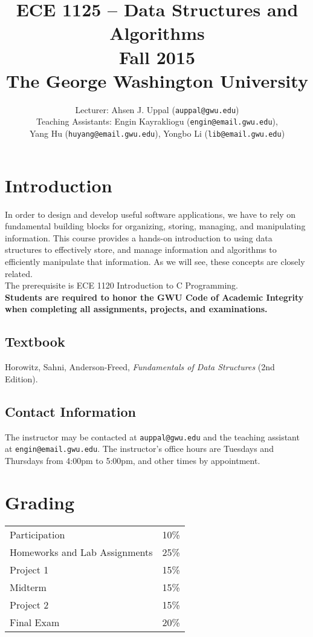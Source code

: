 \documentclass{article}
\title{ECE 1125 -- Data Structures and Algorithms \\ Fall 2015 \\ The George Washington University}
\author{Lecturer: Ahsen J. Uppal (\texttt{auppal@gwu.edu})
\\ Teaching Assistants: Engin Kayrakliogu (\texttt{engin@email.gwu.edu}), \\
Yang Hu (\texttt{huyang@email.gwu.edu}), Yongbo Li (\texttt{lib@email.gwu.edu})}
\date{}
\begin{document}
\maketitle

\section{Introduction}
In order to design and develop useful software applications, we have
to rely on fundamental building blocks for organizing, storing,
managing, and manipulating information. This course provides a
hands-on introduction to using data structures to effectively store,
and manage information and algorithms to efficiently manipulate that
information. As we will see, these concepts are closely related.
\\

The prerequisite is ECE 1120 Introduction to C Programming.
\\

\noindent
\textbf{Students are required to honor the GWU Code of Academic Integrity when completing all assignments, projects, and examinations.}

\subsection{Textbook}
Horowitz, Sahni, Anderson-Freed, \textit{Fundamentals of Data Structures} (2nd Edition).

\subsection{Contact Information}
The instructor may be contacted at \texttt{auppal@gwu.edu} and the
teaching assistant at \texttt{engin@email.gwu.edu}. The instructor's
office hours are Tuesdays and Thursdays from 4:00pm to 5:00pm, and
other times by appointment.


\section{Grading}
\begin{center}
\begin{tabular}{|l|l|}
\hline
Participation & 10\% \\
Homeworks and Lab Assignments & 25\% \\
Project 1 &     15\% \\
Midterm   &     15\% \\
Project 2 &     15\% \\
Final Exam &    20\% \\
\hline
\end{tabular}
\end{center}
\end{document}
